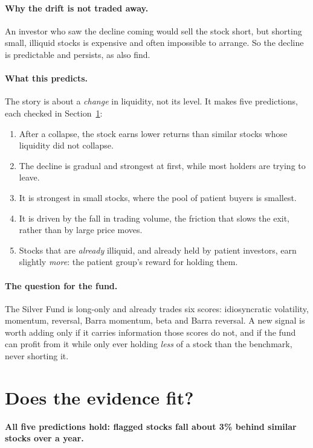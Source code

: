 \documentclass[11pt]{article}
\newcommand{\takeaway}[1]{\noindent\textbf{#1}\par\smallskip}
\begin{document}
\paragraph{Why the drift is not traded away.} An investor who saw the decline coming would sell the stock short, but shorting
small, illiquid stocks is expensive and often impossible to arrange. So the decline is predictable and persists, as
\citet{bali2014} also find.

\paragraph{What this predicts.} The story is about a \emph{change} in liquidity, not its level. It makes five predictions,
each checked in Section~\ref{sec:evidence}:
\begin{enumerate}
  \item After a collapse, the stock earns lower returns than similar stocks whose liquidity did not collapse.
  \item The decline is gradual and strongest at first, while most holders are trying to leave.
  \item It is strongest in small stocks, where the pool of patient buyers is smallest.
  \item It is driven by the fall in trading volume, the friction that slows the exit, rather than by large price moves.
  \item Stocks that are \emph{already} illiquid, and already held by patient investors, earn slightly \emph{more}: the
        patient group's reward for holding them.
\end{enumerate}

\paragraph{The question for the fund.} The Silver Fund is long-only and already trades six scores: idiosyncratic
volatility, momentum, reversal, Barra momentum, beta and Barra reversal. A new signal is worth adding only if it carries
information those scores do not, and if the fund can profit from it while only ever holding \emph{less} of a stock than
the benchmark, never shorting it.

\section{Does the evidence fit?}\label{sec:evidence}
\takeaway{All five predictions hold: flagged stocks fall about 3\% behind similar stocks over a year.}
\end{document}
